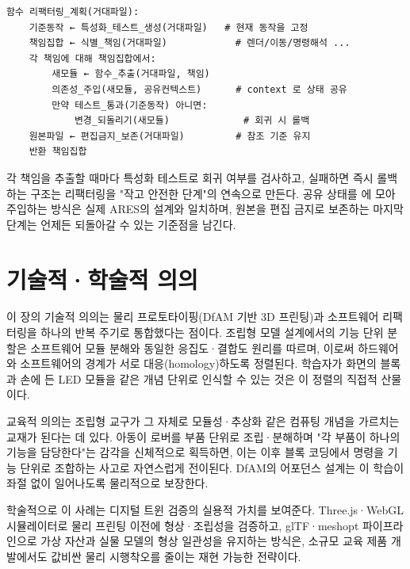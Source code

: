 \begin{verbatim}
함수 리팩터링_계획(거대파일):
    기준동작 ← 특성화_테스트_생성(거대파일)   # 현재 동작을 고정
    책임집합 ← 식별_책임(거대파일)            # 렌더/이동/명령해석 ...
    각 책임에 대해 책임집합에서:
        새모듈 ← 함수_추출(거대파일, 책임)
        의존성_주입(새모듈, 공유컨텍스트)      # context 로 상태 공유
        만약 테스트_통과(기준동작) 아니면:
            변경_되돌리기(새모듈)             # 회귀 시 롤백
    원본파일 ← 편집금지_보존(거대파일)         # 참조 기준 유지
    반환 책임집합
\end{verbatim}

각 책임을 추출할 때마다 특성화 테스트로 회귀 여부를 검사하고, 실패하면 즉시 롤백하는 구조는 리팩터링을 "작고 안전한 단계"의 연속으로 만든다\cite{fowler2018refactoring, feathers2004legacy}. 공유 상태를 에 모아 주입하는 방식은 실제 ARES의  설계와 일치하며\cite{ares-repo}, 원본을 편집 금지로 보존하는 마지막 단계는 언제든 되돌아갈 수 있는 기준점을 남긴다.

\section{기술적·학술적 의의}

이 장의 기술적 의의는 물리 프로토타이핑(DfAM 기반 3D 프린팅)과 소프트웨어 리팩터링을 하나의 반복 주기로 통합했다는 점이다. 조립형 모델 설계에서의 기능 단위 분할은 소프트웨어 모듈 분해\cite{martin2008cleancode, gof1994}와 동일한 응집도·결합도 원리를 따르며, 이로써 하드웨어와 소프트웨어의 경계가 서로 대응(homology)하도록 정렬된다. 학습자가 화면의  블록과 손에 든 LED 모듈을 같은 개념 단위로 인식할 수 있는 것은 이 정렬의 직접적 산물이다.

교육적 의의는 조립형 교구가 그 자체로 모듈성·추상화 같은 컴퓨팅 개념을 가르치는 교재가 된다는 데 있다. 아동이 로버를 부품 단위로 조립·분해하며 "각 부품이 하나의 기능을 담당한다"는 감각을 신체적으로 획득하면, 이는 이후 블록 코딩에서 명령을 기능 단위로 조합하는 사고\cite{brennan2012ct, wing2006ct}로 자연스럽게 전이된다. DfAM의 어포던스 설계\cite{norman2013design}는 이 학습이 좌절 없이 일어나도록 물리적으로 보장한다.

학술적으로 이 사례는 디지털 트윈 검증의 실용적 가치를 보여준다. Three.js·WebGL 시뮬레이터\cite{threejs, webgl, akenine2018realtime}로 물리 프린팅 이전에 형상·조립성을 검증하고, glTF·meshopt 파이프라인\cite{gltf, meshopt}으로 가상 자산과 실물 모델의 형상 일관성을 유지하는 방식은, 소규모 교육 제품 개발에서도 값비싼 물리 시행착오를 줄이는 재현 가능한 전략이다.

